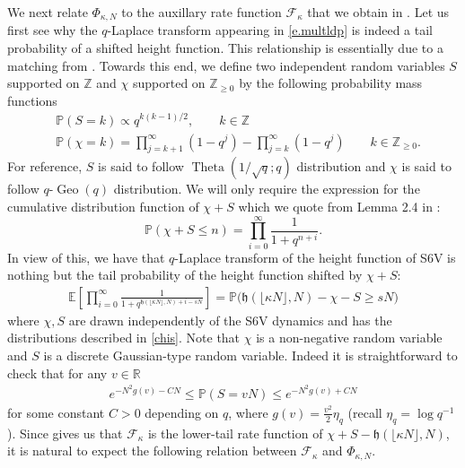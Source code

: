 \documentclass[reqno,11pt]{amsart}
\newcommand{\h}{\mathfrak{h}}
\renewcommand{\Pr}{\mathbb{P}}
\newcommand{\logq}{\eta_q}
\numberwithin{equation}{section}
\theoremstyle{definition}
\newcommand{\R}{\mathbb{R}}
\newcommand{\Z}{\mathbb{Z}}
\begin{document}
We next relate $\Phi_{\kappa,N}$ to the auxillary rate function $\mathcal{F}_\kappa$ that we obtain in . Let us first see why the $q$-Laplace transform appearing in \eqref{e.multldp} is indeed a tail probability of a shifted height function. {This relationship is essentially due to a matching from \cite{IMS_matching}}. Towards this end, we define two independent random variables $S$ supported on $\mathbb{Z}$ and $\chi$ supported on $\Z_{\ge 0}$ by the following probability mass functions
\begin{equation}
\label{chis}
    \begin{aligned}
    & \Pr(S =k) \propto q^{k(k-1)/2}, \qquad  k\in \mathbb{Z} \\ & \Pr(\chi=k)=\prod_{j=k+1}^{\infty} (1-q^j)-\prod_{j=k}^{\infty} (1-q^j)\qquad k\in \Z_{\ge 0}.
\end{aligned}
\end{equation}
For reference, $S$ is said to follow $\operatorname{Theta}(1/\sqrt{q};q)$ distribution and $\chi$ is said to follow $q$-$\operatorname{Geo}(q)$ distribution. We will only require the expression for the cumulative distribution function of $\chi+S$ which we quote from Lemma 2.4 in \cite{IMS_matching}: 
\begin{equation}\label{chisd}
    \mathbb{P}(\chi + S \le n) =  \prod_{i =0}^\infty \frac{1}{1+q^{n+i}}.
\end{equation}
In view of this, we have that $q$-Laplace transform of the height function of S6V is nothing but the tail probability of the height function shifted by $\chi+S$:
\begin{align*}
    \mathbb{E} \left[\prod_{i= 0}^\infty\frac{1}{1+ q^{\mathfrak{h}(\lfloor\kappa N\rfloor,N)+i-sN}}\right] = \Pr\big(\mathfrak{h}(\lfloor\kappa N\rfloor,N)-\chi-S \ge sN\big)
\end{align*}
where $\chi,S$ are drawn independently of the S6V dynamics and has the distributions described in \eqref{chis}. Note that $\chi$ is a non-negative random variable and $S$ is a discrete Gaussian-type random variable. Indeed it is straightforward to check that for any $v\in \R$ 
\begin{align*}
   e^{-N^2g(v)-CN} \le \Pr(S=vN) \le e^{-N^2g(v)+CN} 
\end{align*}
 for some constant $C>0$ depending on $q$, where $g(v)=\frac{v^2}{2}\logq$ (recall $\logq=\log q^{-1}$). Since  gives us that $\mathcal{F}_\kappa$ is the lower-tail rate function of $\chi+S-\h(\lfloor \kappa N\rfloor,N)$, it is natural to expect the following relation between $\mathcal{F}_\kappa$ and $\Phi_{\kappa,N}$.
\end{document}
